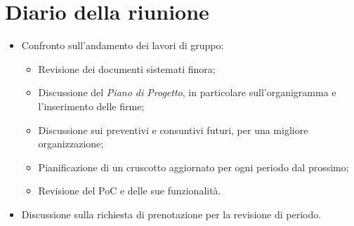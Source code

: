 \section{Diario della riunione}
\begin{itemize}
  \item Confronto sull'andamento dei lavori di gruppo:
  \begin{itemize}
    \item Revisione dei documenti sistemati finora;
    \item Discussione del \textit{Piano di Progetto}, in particolare sull'organigramma e l'inserimento delle firme;
    \item Discussione sui preventivi e consuntivi futuri, per una migliore organizzazione;
    \item Pianificazione di un cruscotto aggiornato per ogni periodo dal prossimo;
    \item Revisione del PoC e delle sue funzionalità.
  \end{itemize}
  \item Discussione sulla richiesta di prenotazione per la revisione di periodo.
\end{itemize}
